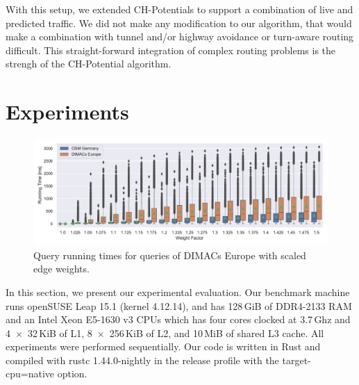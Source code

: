 \documentclass[letterpaper]{article} %
\begin{document}
With this setup, we extended CH-Potentials to support a combination of live and predicted traffic.
We did not make any modification to our algorithm, that would make a combination with tunnel and/or highway avoidance or turn-aware routing difficult.
This straight-forward integration of complex routing problems is the strengh of the CH-Potential algorithm.

\section{Experiments}

\label{sec:experiments}

\begin{figure}
\centering
\includegraphics[width=\textwidth]{fig/scaled_weights.pdf}
\caption{Query running times for queries of DIMACs Europe with scaled edge weights.}\label{fig:scaled_weights}
\end{figure}

In this section, we present our experimental evaluation.
Our benchmark machine runs openSUSE Leap 15.1 (kernel 4.12.14), and has 128\,GiB of DDR4-2133 RAM and an Intel Xeon E5-1630 v3 CPUs which has four cores clocked at 3.7\,Ghz and 4~$\times$~32\,KiB of L1, 8~$\times$~256\,KiB of L2, and 10\,MiB of shared L3 cache.
All experiments were performed sequentially.
Our code is written in Rust and compiled with rustc 1.44.0-nightly in the release profile with the target-cpu=native option.
\end{document}
